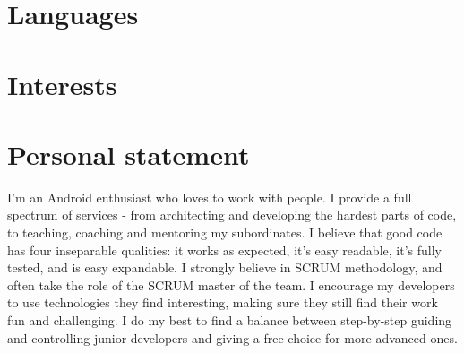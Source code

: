 \documentclass[letterpaper]{twentysecondcv} %
\begin{document}

\section{Languages}

\begin{twentyshort} %
\end{twentyshort}


\section{Interests}

\begin{twentyshort} %
\end{twentyshort}


\section{Personal statement}

I'm an Android enthusiast who loves to work with people. I provide a full spectrum of services - from architecting and developing the hardest parts of code, to teaching, coaching and mentoring my subordinates. I believe that good code has four inseparable qualities: it works as expected, it's easy readable, it's fully tested, and is easy expandable. I strongly believe in SCRUM methodology, and often take the role of the SCRUM master of the team. I encourage my developers to use technologies they find interesting, making sure they still find their work fun and challenging. I do my best to find a balance between step-by-step guiding and controlling junior developers and giving a free choice for more advanced ones.
\end{document}
